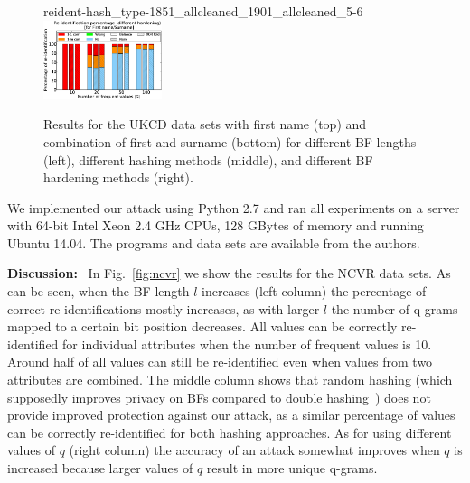 \documentclass{llncs}
\begin{document}
\begin{figure}[!t]
    {reident-hash_type-1851_allcleaned_1901_allcleaned_5-6}
  ~~
  \includegraphics[width=0.31\textwidth]
    {reident-bf_harden-1851_allcleaned_1901_allcleaned_5-6}
  \caption{Results for the UKCD data sets with first name (top) and
  combination of first and surname (bottom) for different BF lengths
  (left), different hashing methods (middle), and different BF
  hardening methods (right).
  \label{fig:ukcd}}
\end{figure}

We implemented our attack using Python 2.7 and ran all experiments on
a server with 64-bit Intel Xeon 2.4 GHz CPUs, 128 GBytes of memory
and running Ubuntu 14.04. The programs and data sets are available
from the authors. 


\smallskip

\textbf{Discussion:}~
In Fig.~\ref{fig:ncvr} we show the results for the NCVR data sets.
%
As can be seen, when the BF length $l$ increases (left column) the
percentage of correct re-identifications mostly increases, as with
larger $l$ the number of q-grams mapped to a certain bit position
decreases. All values can be correctly re-identified for individual
attributes
when the number of frequent values is 10.
Around half of all
values can still be re-identified even when values from two
attributes are combined.
%
The middle column
shows that random hashing
(which supposedly improves privacy on BFs compared to double
hashing~\cite{Kro15,Nie14}) does not provide improved protection
against our attack, as a similar percentage of values can be
correctly re-identified for both hashing approaches. As for using
different values of $q$ (right column)
the accuracy of an attack somewhat improves when $q$ is increased
because larger values of $q$ result in more unique q-grams.
\end{document}
